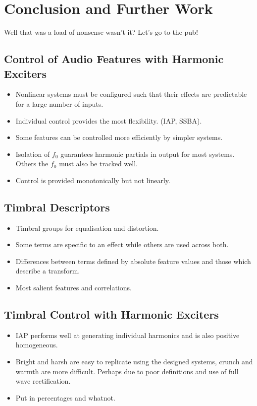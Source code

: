\chapter{Conclusion and Further Work}
\label{chap:Conclusion}
	\note
	{
		Well that was a load of nonsense wasn't it? Let's go to the pub!
	}

\section{Control of Audio Features with Harmonic Exciters}
\label{sec:Conclusion-FeatureConrol}
	\note
	{
		\begin{itemize}
			\item Nonlinear systems must be configured such that their effects are predictable for a large
				number of inputs.
			\item Individual control provides the most flexibility. (IAP, SSBA).
			\item Some features can be controlled more efficiently by simpler systems.
			\item Isolation of $f_{0}$ guarantees harmonic partials in output for most systems. Others the
				$f_{0}$ must also be tracked well.
			\item Control is provided monotonically but not linearly.
		\end{itemize}
	}

\section{Timbral Descriptors}
\label{sec:Conclusion-Descriptors}
	\note
	{
		\begin{itemize}
			\item Timbral groups for equalisation and distortion.
			\item Some terms are specific to an effect while others are used across both.
			\item Differences between terms defined by absolute feature values and those which describe a
				transform.
			\item Most salient features and correlations.
		\end{itemize}
	}

\section{Timbral Control with Harmonic Exciters}
\label{sec:Conclusion-TimbralControl}
	\note
	{
		\begin{itemize}
			\item IAP performs well at generating individual harmonics and is also positive homogeneous.
			\item Bright and harsh are easy to replicate using the designed systems, crunch and warmth are more
				difficult. Perhaps due to poor definitions and use of full wave rectification.
			\item Put in percentages and whatnot.
		\end{itemize}
	}

